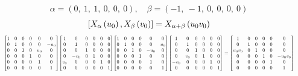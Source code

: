 \documentclass[11pt]{article}
\theoremstyle{definition}
\begin{document}
\[
\alpha = \left( 0, \  1, \  1, \  0, \  0, \  0\right), \quad \beta = \left( -1, \  -1, \  0, \  0, \  0, \  0\right)
\]
\[
\scaletoalign{\textwidth}{\left[ X_{\alpha}\left(u_{0}\right), X_{\beta}\left(v_{0}\right) \right] = X_{\alpha + \beta}\left(u_{0} v_{0}\right)}
\]
\[
\scaletoalign{\textwidth}{{\left[\begin{matrix}1 & 0 & 0 & 0 & 0 & 0\\0 & 1 & 0 & 0 & 0 & - u_{0}\\0 & 0 & 1 & 0 & u_{0} & 0\\0 & 0 & 0 & 1 & 0 & 0\\0 & 0 & 0 & 0 & 1 & 0\\0 & 0 & 0 & 0 & 0 & 1\end{matrix}\right]} {\left[\begin{matrix}1 & 0 & 0 & 0 & 0 & 0\\0 & 1 & 0 & 0 & 0 & 0\\0 & 0 & 1 & 0 & 0 & 0\\0 & - v_{0} & 0 & 1 & 0 & 0\\v_{0} & 0 & 0 & 0 & 1 & 0\\0 & 0 & 0 & 0 & 0 & 1\end{matrix}\right]} {\left[\begin{matrix}1 & 0 & 0 & 0 & 0 & 0\\0 & 1 & 0 & 0 & 0 & u_{0}\\0 & 0 & 1 & 0 & - u_{0} & 0\\0 & 0 & 0 & 1 & 0 & 0\\0 & 0 & 0 & 0 & 1 & 0\\0 & 0 & 0 & 0 & 0 & 1\end{matrix}\right]} {\left[\begin{matrix}1 & 0 & 0 & 0 & 0 & 0\\0 & 1 & 0 & 0 & 0 & 0\\0 & 0 & 1 & 0 & 0 & 0\\0 & v_{0} & 0 & 1 & 0 & 0\\- v_{0} & 0 & 0 & 0 & 1 & 0\\0 & 0 & 0 & 0 & 0 & 1\end{matrix}\right]} = {\left[\begin{matrix}1 & 0 & 0 & 0 & 0 & 0\\0 & 1 & 0 & 0 & 0 & 0\\u_{0} v_{0} & 0 & 1 & 0 & 0 & 0\\0 & 0 & 0 & 1 & 0 & - u_{0} v_{0}\\0 & 0 & 0 & 0 & 1 & 0\\0 & 0 & 0 & 0 & 0 & 1\end{matrix}\right]}}
\]
\end{document}
